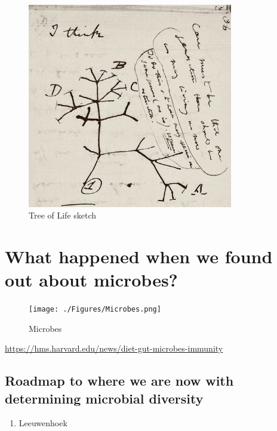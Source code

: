 \documentclass[
]{book}
\providecommand{\tightlist}{%
  \setlength{\itemsep}{0pt}\setlength{\parskip}{0pt}}
\begin{document}
\begin{figure}
\centering
\includegraphics[width=0.8\textwidth,height=\textheight]{./Figures/Darwin.png}
\caption{Tree of Life sketch}
\end{figure}

\hypertarget{what-happened-when-we-found-out-about-microbes}{%
\section{What happened when we found out about microbes?}\label{what-happened-when-we-found-out-about-microbes}}

\begin{figure}
\centering
\texttt{[image: ./Figures/Microbes.png]}
\caption{Microbes}
\end{figure}

\url{https://hms.harvard.edu/news/diet-gut-microbes-immunity}

\hypertarget{roadmap-to-where-we-are-now-with-determining-microbial-diversity}{%
\subsection*{Roadmap to where we are now with determining microbial diversity}\label{roadmap-to-where-we-are-now-with-determining-microbial-diversity}}

\begin{enumerate}
\def\labelenumi{\arabic{enumi}.}
\tightlist
\item
  Leeuwenhoek
\end{enumerate}
\end{document}
